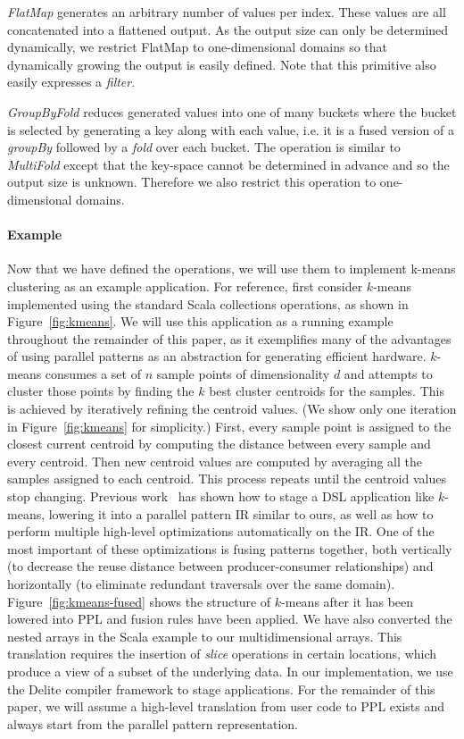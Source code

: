 \emph{FlatMap} generates an arbitrary number of values per index.
These values are all concatenated into a flattened output.
As the output size can only be determined dynamically, we restrict FlatMap to one-dimensional domains so that dynamically growing the output is easily defined.
Note that this primitive also easily expresses a \emph{filter}.

\emph{GroupByFold} reduces generated values into one of many buckets where the bucket is selected by generating a key along with each value, i.e. it is a fused version of a \emph{groupBy} followed by a \emph{fold} over each bucket.
The operation is similar to \emph{MultiFold} except that the key-space cannot be determined in advance and so the output size is unknown.
Therefore we also restrict this operation to one-dimensional domains.




\paragraph{Example}
Now that we have defined the operations, we will use them to implement k-means clustering as an example application.
For reference, first consider $k$-means implemented using the standard Scala collections operations, as shown in Figure~\ref{fig:kmeans}.
We will use this application as a running example throughout the remainder of this paper, as it exemplifies many of the advantages of using parallel patterns as an abstraction for generating efficient hardware.
$k$-means consumes a set of $n$ sample points of dimensionality $d$ and attempts to cluster those points by finding the $k$ best cluster centroids for the samples.
This is achieved by iteratively refining the centroid values.
(We show only one iteration in Figure~\ref{fig:kmeans} for simplicity.)
First, every sample point is assigned to the closest current centroid by computing the distance between every sample and every centroid.
Then new centroid values are computed by averaging all the samples assigned to each centroid.
This process repeats until the centroid values stop changing.
Previous work~\cite{rompf12optimizing,brown16clusters,chambers10flumejava} has shown how to stage a DSL application like $k$-means, lowering it into a parallel pattern IR similar to ours, as well as how to perform multiple high-level optimizations automatically on the IR.
One of the most important of these optimizations is fusing patterns together, both vertically (to decrease the reuse distance between producer-consumer relationships) and horizontally (to eliminate redundant traversals over the same domain).
Figure~\ref{fig:kmeans-fused} shows the structure of $k$-means after it has been lowered into PPL and fusion rules have been applied.
We have also converted the nested arrays in the Scala example to our multidimensional arrays.
This translation requires the insertion of \emph{slice} operations in certain locations, which produce a view of a subset of the underlying data.
In our implementation, we use the Delite compiler framework \cite{delite-tecs14} to stage applications. For the remainder of this paper, we will assume a high-level translation from user code to PPL exists and always start from the parallel pattern representation.

